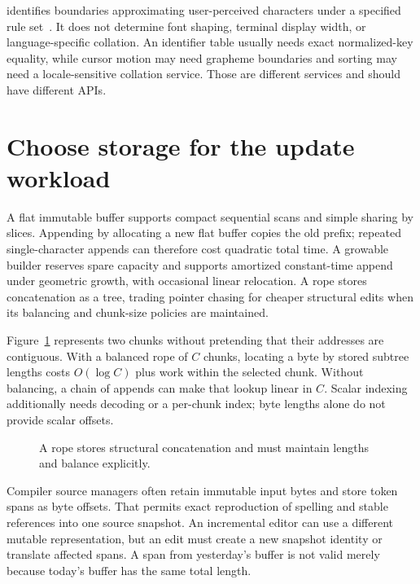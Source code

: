 identifies boundaries approximating user-perceived characters under a specified rule set~\cite{unicode-2026-segmentation}.
It does not determine font shaping, terminal display width, or language-specific collation.
An identifier table usually needs exact normalized-key equality, while cursor motion may need grapheme boundaries and sorting may need a locale-sensitive collation service.
Those are different services and should have different APIs.

\section{Choose storage for the update workload}
\label{sec:ch77-storage}
A flat immutable buffer supports compact sequential scans and simple sharing by slices.
Appending by allocating a new flat buffer copies the old prefix; repeated single-character appends can therefore cost quadratic total time.
A growable builder reserves spare capacity and supports amortized constant-time append under geometric growth, with occasional linear relocation.
A rope stores concatenation as a tree, trading pointer chasing for cheaper structural edits when its balancing and chunk-size policies are maintained.

Figure~\ref{fig:ch77-rope} represents two chunks without pretending that their addresses are contiguous.
With a balanced rope of $C$ chunks, locating a byte by stored subtree lengths costs $O(\log C)$ plus work within the selected chunk.
Without balancing, a chain of appends can make that lookup linear in $C$.
Scalar indexing additionally needs decoding or a per-chunk index; byte lengths alone do not provide scalar offsets.

\begin{figure}[htbp]
\centering
{}
\caption{A rope stores structural concatenation and must maintain lengths and balance explicitly.}
\label{fig:ch77-rope}
\end{figure}

Compiler source managers often retain immutable input bytes and store token spans as byte offsets.
That permits exact reproduction of spelling and stable references into one source snapshot.
An incremental editor can use a different mutable representation, but an edit must create a new snapshot identity or translate affected spans.
A span from yesterday's buffer is not valid merely because today's buffer has the same total length.

